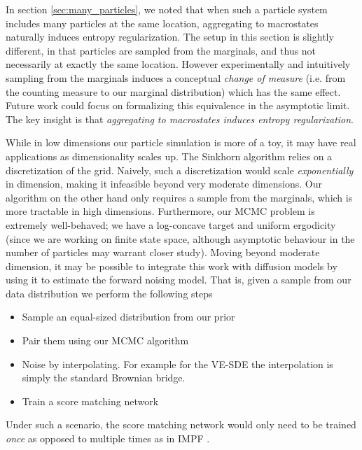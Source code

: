 \documentclass{article}
\begin{document}
In section \ref{sec:many_particles}, we noted that when such a particle system
includes many particles at the same location, aggregating to macrostates
naturally induces entropy regularization. The setup in this section is
slightly different, in that particles are sampled from the marginals, and thus
not necessarily at exactly the same location. However experimentally and
intuitively sampling from the marginals induces a conceptual \emph{change of measure}
(i.e. from the counting measure to our marginal distribution) which has
the same effect. Future work could focus on formalizing this equivalence in
the asymptotic limit. The key insight is that \emph{aggregating to macrostates
induces entropy regularization}.

While in low dimensions our particle simulation is more of a toy, it may have
real applications as dimensionality scales up. The Sinkhorn algorithm relies
on a discretization of the grid. Naively, such a discretization would
scale \emph{exponentially} in dimension, making it infeasible beyond very
moderate dimensions. Our algorithm on the other hand only requires a sample
from the marginals, which is more tractable in high dimensions.
Furthermore, our MCMC problem is extremely well-behaved; we have a log-concave
target and uniform ergodicity (since we are working on finite state space,
although asymptotic behaviour in the number of particles may warrant closer
study). Moving beyond moderate dimension, it may be possible to integrate this
work with diffusion models by using it to estimate the forward noising model.
That is, given a sample from our data distribution we perform the following steps
\begin{itemize}
    \item Sample an equal-sized distribution from our prior
    \item Pair them using our MCMC algorithm
    \item Noise by interpolating. For example for
the VE-SDE the interpolation is simply the standard Brownian bridge. 
    \item Train a score matching network
\end{itemize}
Under such a scenario, the score
matching network would only need to be trained \emph{once} as opposed to
multiple times as in IMPF
\cite{debortoli2023diffusionschrodingerbridgeapplications}.
\end{document}
